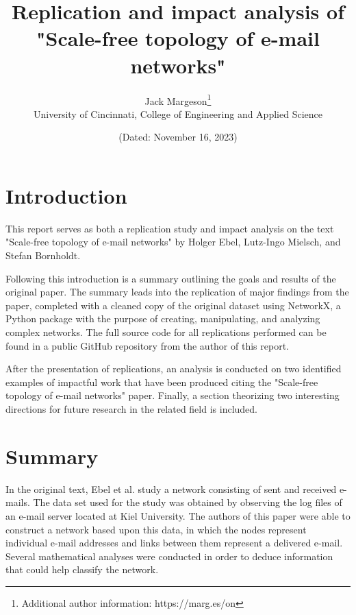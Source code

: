 \documentclass[a4paper]{article}
\title{Replication and impact analysis of\\"Scale-free topology of e-mail networks" }
\author{Jack Margeson\thanks{Additional author information: https://marg.es/on}\\
University of Cincinnati, College of Engineering and Applied Science}
\date{\normalsize{(Dated: November 16, 2023)}}
\begin{document}
\maketitle

\vspace{-3mm} %

\begin{abstract}
    \blindtext
\end{abstract}

\vspace{5mm} %

\begin{multicols}{2}

\section{Introduction}
\hspace*{\parindent}This report serves as both a replication study and impact analysis on the text "Scale-free topology of e-mail networks" \cite{1} by Holger Ebel, Lutz-Ingo Mielsch, and Stefan Bornholdt. 

Following this introduction is a summary outlining the goals and results of the original paper. The summary leads into the replication of major findings from the paper, completed with a cleaned copy of the original dataset using NetworkX, a Python package with the purpose of creating, manipulating, and analyzing complex networks. The full source code for all replications performed can be found in a public GitHub repository \cite{2} from the author of this report. 

After the presentation of replications, an analysis is conducted on two identified examples of impactful work that have been produced citing the "Scale-free topology of e-mail networks" paper. Finally, a section theorizing two interesting directions for future research in the related field is included.

\section{Summary}
\hspace*{\parindent}In the original text, Ebel et al. study a network consisting of sent and received e-mails. The data set used for the study was obtained by observing the log files of an e-mail server located at Kiel University. The authors of this paper were able to construct a network based upon this data, in which the nodes represent individual e-mail addresses and links between them represent a delivered e-mail. Several mathematical analyses were conducted in order to deduce information that could help classify the network. 


\end{multicols}
\end{document}
